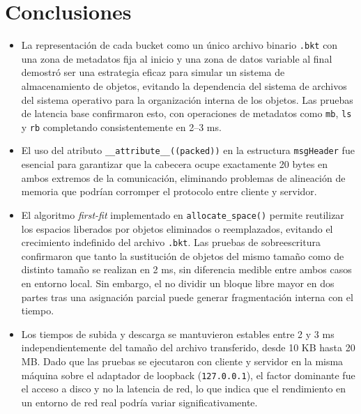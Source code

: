 \documentclass[12pt, letterpaper]{article}
\begin{document}
\section{Conclusiones}
\begin{itemize}
    \item La representación de cada bucket como un único archivo binario 
          \texttt{.bkt} con una zona de metadatos fija al inicio y una 
          zona de datos variable al final demostró ser una estrategia 
          eficaz para simular un sistema de almacenamiento de objetos, 
          evitando la dependencia del sistema de archivos del sistema 
          operativo para la organización interna de los objetos. Las 
          pruebas de latencia base confirmaron esto, con operaciones de 
          metadatos como \texttt{mb}, \texttt{ls} y \texttt{rb} 
          completando consistentemente en 2--3 ms.

    \item El uso del atributo \texttt{\_\_attribute\_\_((packed))} en la 
          estructura \texttt{msgHeader} fue esencial para garantizar que 
          la cabecera ocupe exactamente 20 bytes en ambos extremos de la 
          comunicación, eliminando problemas de alineación de memoria que 
          podrían corromper el protocolo entre cliente y servidor.

    \item El algoritmo \textit{first-fit} implementado en 
          \texttt{allocate\_space()} permite reutilizar los espacios 
          liberados por objetos eliminados o reemplazados, evitando el 
          crecimiento indefinido del archivo \texttt{.bkt}. Las pruebas 
          de sobreescritura confirmaron que tanto la sustitución de objetos 
          del mismo tamaño como de distinto tamaño se realizan en 2 ms, 
          sin diferencia medible entre ambos casos en entorno local. Sin 
          embargo, el no dividir un bloque libre mayor en dos partes tras 
          una asignación parcial puede generar fragmentación interna con 
          el tiempo.

    \item Los tiempos de subida y descarga se mantuvieron estables entre 
          2 y 3 ms independientemente del tamaño del archivo transferido, 
          desde 10 KB hasta 20 MB. Dado que las pruebas se ejecutaron con 
          cliente y servidor en la misma máquina sobre el adaptador de 
          loopback (\texttt{127.0.0.1}), el factor dominante fue el acceso 
          a disco y no la latencia de red, lo que indica que el rendimiento 
          en un entorno de red real podría variar significativamente.


\end{itemize}
\end{document}
